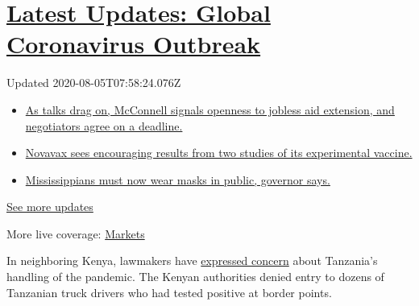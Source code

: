 \hypertarget{latest-updates-global-coronavirus-outbreak}{%
\section{\texorpdfstring{\href{https://www.nytimes3xbfgragh.onion/2020/08/04/world/coronavirus-cases.html?action=click\&pgtype=Article\&state=default\&region=MAIN_CONTENT_1\&context=storylines_live_updates}{Latest
Updates: Global Coronavirus
Outbreak}}{Latest Updates: Global Coronavirus Outbreak}}\label{latest-updates-global-coronavirus-outbreak}}

Updated 2020-08-05T07:58:24.076Z

\begin{itemize}
\tightlist
\item
  \href{https://www.nytimes3xbfgragh.onion/2020/08/04/world/coronavirus-cases.html?action=click\&pgtype=Article\&state=default\&region=MAIN_CONTENT_1\&context=storylines_live_updates\#link-762df92}{As
  talks drag on, McConnell signals openness to jobless aid extension,
  and negotiators agree on a deadline.}
\item
  \href{https://www.nytimes3xbfgragh.onion/2020/08/04/world/coronavirus-cases.html?action=click\&pgtype=Article\&state=default\&region=MAIN_CONTENT_1\&context=storylines_live_updates\#link-1228a480}{Novavax
  sees encouraging results from two studies of its experimental
  vaccine.}
\item
  \href{https://www.nytimes3xbfgragh.onion/2020/08/04/world/coronavirus-cases.html?action=click\&pgtype=Article\&state=default\&region=MAIN_CONTENT_1\&context=storylines_live_updates\#link-794484ed}{Mississippians
  must now wear masks in public, governor says.}
\end{itemize}

\href{https://www.nytimes3xbfgragh.onion/2020/08/04/world/coronavirus-cases.html?action=click\&pgtype=Article\&state=default\&region=MAIN_CONTENT_1\&context=storylines_live_updates}{See
more updates}

More live coverage:
\href{https://www.nytimes3xbfgragh.onion/live/2020/08/04/business/stock-market-today-coronavirus?action=click\&pgtype=Article\&state=default\&region=MAIN_CONTENT_1\&context=storylines_live_updates}{Markets}

In neighboring Kenya, lawmakers have
\href{https://www.youtube.com/watch?v=K1PeaFeAxGM}{expressed concern}
about Tanzania's handling of the pandemic. The Kenyan authorities denied
entry to dozens of Tanzanian truck drivers who had tested positive at
border points.

